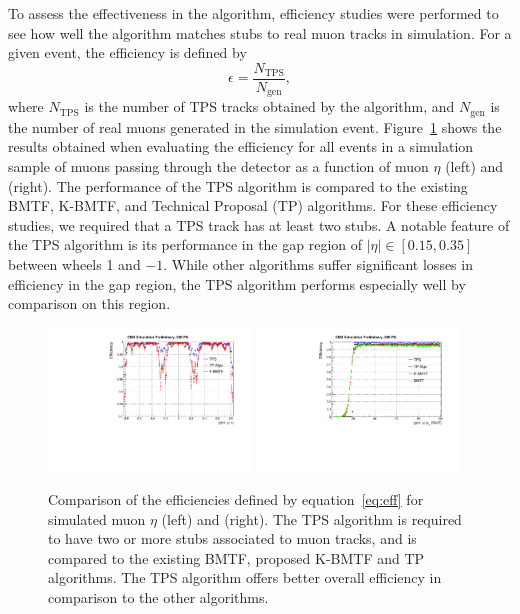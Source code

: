 To assess the effectiveness in the algorithm, efficiency studies were performed to see how well the algorithm matches stubs to real muon tracks in simulation.
For a given event, the efficiency is defined by
\begin{equation}\label{eq:eff}
  \epsilon=\frac{N_\mathrm{TPS}}{N_\mathrm{gen}},
\end{equation}
where $N_\mathrm{TPS}$ is the number of TPS tracks obtained by the algorithm, and $N_\mathrm{gen}$ is the number of real muons generated in the simulation event.
Figure~\ref{fig:eff} shows the results obtained when evaluating the efficiency for all events in a simulation sample of muons passing through the detector as a function of muon $\eta$ (left) and \pt (right).
The performance of the TPS algorithm is compared to the existing BMTF, K-BMTF, and Technical Proposal (TP) algorithms.
For these efficiency studies, we required that a TPS track has at least two stubs.
A notable feature of the TPS algorithm is its performance in the gap region of $|\eta|\in[0.15,0.35]$ between wheels 1 and $-1$.
While other algorithms suffer significant losses in efficiency in the gap region, the TPS algorithm performs especially well by comparison on this region.

\begin{figure}[htbp] %
  \centering
  \includegraphics[width=0.48\textwidth]{fig/TPS/effEta20GeV.pdf}
  \includegraphics[width=0.48\textwidth]{fig/TPS/effPt20GeV.pdf}
  \caption{Comparison of the efficiencies defined by equation~\ref{eq:eff} for simulated muon $\eta$ (left) and \pt (right). The TPS algorithm is required to have two or more stubs associated to muon tracks, and is compared to the existing BMTF, proposed K-BMTF and TP algorithms. The TPS algorithm offers better overall efficiency in comparison to the other algorithms.}
  \label{fig:eff}
\end{figure}

